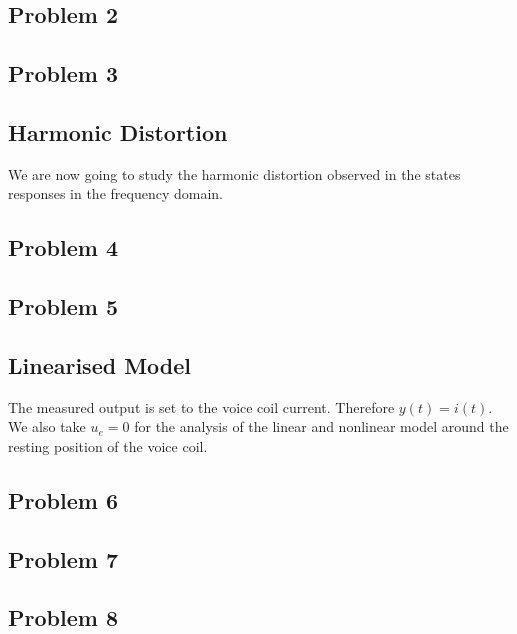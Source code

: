\documentclass[12pt,a4paper,fleqn, onesside]{report}
\begin{document}
\subsection*{Problem 2}

\subsection*{Problem 3}


\subsection{Harmonic Distortion}
We are now going to study the harmonic distortion observed in the states responses in the frequency domain. 
\subsection*{Problem 4}

\subsection*{Problem 5}


\subsection{Linearised Model}
The measured output is set to the voice coil current. Therefore $y(t) = i(t)$.
We also take $u_{e} = 0$ for the analysis of the linear and nonlinear model around the resting position of the voice coil. 

\subsection*{Problem 6}


\subsection*{Problem 7}


\subsection*{Problem 8}

\end{document}
